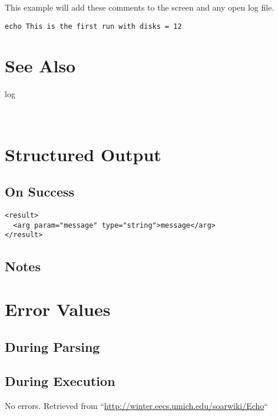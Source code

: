 \documentclass[10pt]{article}
\begin{document}
 This example will add these comments to the screen and any open log file. \begin{verbatim}
echo This is the first run with disks = 12

\end{verbatim}

\section*{ See Also }
\begin{description}
log

\end{description}


 \\ 

\section*{ Structured Output }
\subsection*{ On Success }
\begin{verbatim}
<result>
  <arg param="message" type="string">message</arg>
</result>

\end{verbatim}
\subsection*{ Notes }
\section*{ Error Values }
\subsection*{ During Parsing }
\subsection*{ During Execution }


 No errors.  Retrieved from ``\url{http://winter.eecs.umich.edu/soarwiki/Echo}``
\end{document}
